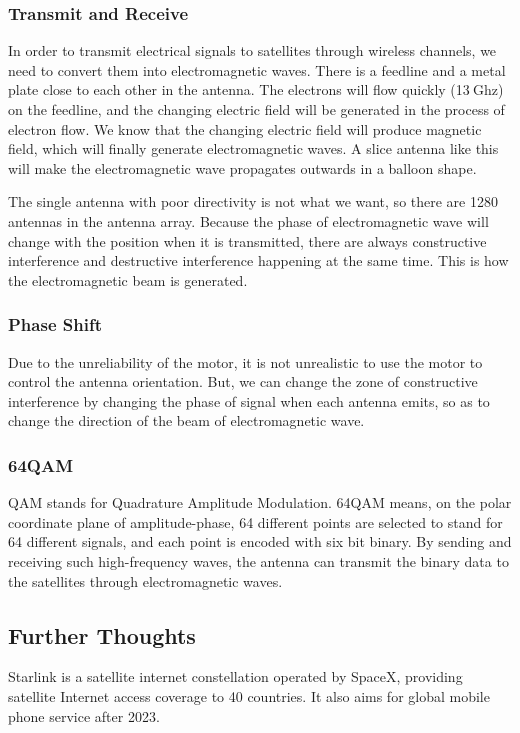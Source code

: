 \documentclass{article}
\begin{document}
\subsubsection{Transmit and Receive}
In order to transmit electrical signals to satellites through wireless channels, we need to convert them into electromagnetic waves. There is a feedline and a metal plate close to each other in the antenna. The electrons will flow quickly (13$~\mathrm{Ghz}$) on the feedline, and the changing electric field will be generated in the process of electron flow. We know that the changing electric field will produce magnetic field, which will finally generate electromagnetic waves. A slice antenna like this will make the electromagnetic wave propagates outwards in a balloon shape.

The single antenna with poor directivity is not what we want, so there are 1280 antennas in the antenna array. Because the phase of electromagnetic wave will change with the position when it is transmitted, there are always constructive interference and destructive interference happening at the same time. This is how the electromagnetic beam is generated.
\subsubsection{Phase Shift}
Due to the unreliability of the motor, it is not unrealistic to use the motor to control the antenna orientation. But, we can change the zone of constructive interference by changing the phase of signal when each antenna emits, so as to change the direction of the beam of electromagnetic wave.
\subsubsection{64QAM}
QAM stands for Quadrature Amplitude Modulation. 64QAM means, on the polar coordinate plane of amplitude-phase, 64 different points are selected to stand for 64 different signals, and each point is encoded with six bit binary. By sending and receiving such high-frequency waves, the antenna can transmit the binary data to the satellites through electromagnetic waves.
\subsection{Further Thoughts}
Starlink is a satellite internet constellation operated by SpaceX, providing satellite Internet access coverage to 40 countries. It also aims for global mobile phone service after 2023.\cite{wiki_starlink}
\end{document}
